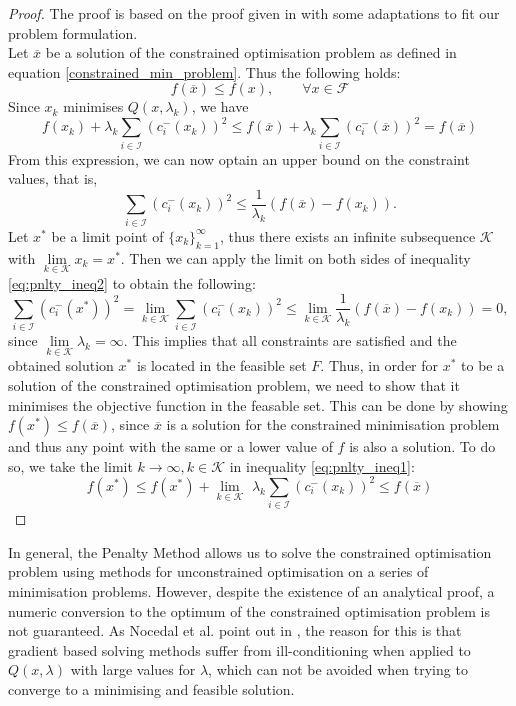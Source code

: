\begin{proof}
	The proof is based on the proof given in \cite{NoceWrig06} with some adaptations to fit our problem formulation.\\
	Let $\overline{x}$ be a solution of the constrained optimisation problem as defined in equation \eqref{constrained_min_problem}. Thus the following holds: \[ f(\overline{x}) \leq f(x), \qquad \forall x \in \mathcal{F}\]
	Since $x_k$ minimises $Q(x, \lambda_k)$, we have 
	\begin{equation}
	\label{eq:pnlty_ineq1}
	f(x_k) + \lambda_k \sum_{i \in \mathcal{I}} (c_i^{-}(x_k))^2 \leq 
	f(\overline{x}) + \lambda_k \sum_{i \in \mathcal{I}} (c_i^{-}(\overline{x}))^2 =
	f(\overline{x})
	\end{equation}
	From this expression, we can now optain an upper bound on the constraint values, that is, 
	\begin{equation}
	\label{eq:pnlty_ineq2}
	\sum_{i \in \mathcal{I}} (c_i^{-}(x_k))^2 \leq \frac{1}{\lambda_k} (f(\overline{x}) - f(x_k)).
	\end{equation}
	Let $x^*$ be a limit point of $\{x_k\}_{k = 1}^{\infty}$, thus there exists an infinite subsequence $\mathcal{K}$ with $\underset{k \in \mathcal{K}}{\lim} x_k = x^*$. Then we can apply the limit on both sides of inequality \eqref{eq:pnlty_ineq2} to obtain the following:
	\[ 
	\sum_{i \in \mathcal{I}} (c_i^{-}(x^*))^2 = 
	\underset{k \in \mathcal{K}}{\lim} \sum_{i \in \mathcal{I}} (c_i^{-}(x_k))^2 \leq
	\underset{k \in \mathcal{K}}{\lim} \frac{1}{\lambda_k} (f(\overline{x}) - f(x_k)) = 0,
	 \]
	 since $\underset{k \in \mathcal{K}}{\lim} \lambda_k = \infty$. This implies that all constraints are satisfied and the obtained solution $x^*$ is located in the feasible set $F$. Thus, in order for $x^*$ to be a solution of the constrained optimisation problem, we need to show that it minimises the objective function in the feasable set. This can be done by showing $f(x^*) \leq f(\overline{x})$, since $\overline{x}$ is a solution for the constrained minimisation problem and thus any point with the same or a lower value of $f$ is also a solution. To do so, we take the limit $k \to \infty, k \in \mathcal{K}$ in inequality \eqref{eq:pnlty_ineq1}:
	 \[ f(x^*) \leq f(x^*) +  \underset{k \in \mathcal{K}}{\lim} \,\,\lambda_k \sum_{i \in \mathcal{I}} (c_i^{-}(x_k))^2 \leq f(\overline{x})\]
\end{proof}

In general, the Penalty Method allows us to solve the constrained optimisation problem using methods for unconstrained optimisation on a series of minimisation problems. However, despite the existence of an analytical proof, a numeric conversion to the optimum of the constrained optimisation problem is not guaranteed. As Nocedal et al. point out in \cite{NoceWrig06}, the reason for this is that gradient based solving methods suffer from ill-conditioning when applied to $Q(x, \lambda)$ with large values for $\lambda$, which can not be avoided when trying to converge to a minimising and feasible solution.

